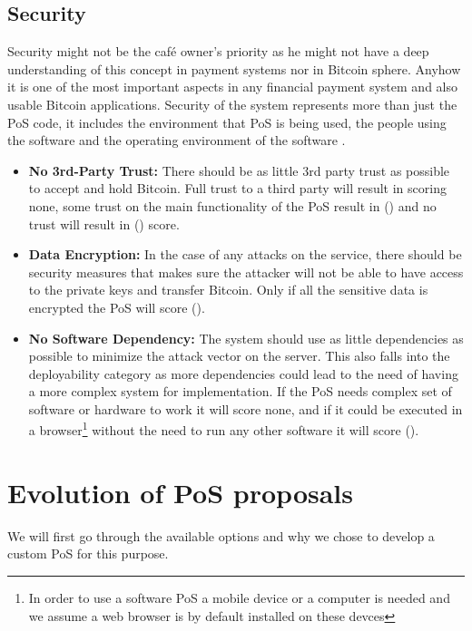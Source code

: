 \subsection{Security} Security might not be the caf\'{e} owner's priority as he might not have a deep understanding of this concept in payment systems nor in Bitcoin sphere. Anyhow it is one of the most important aspects in any financial payment system and also usable Bitcoin applications. Security of the system represents more than just the PoS code, it includes the environment that PoS is being used, the people using the software and the operating environment of the software \cite{securityreq}.
\begin{itemize}

\item \textbf{No 3rd-Party Trust: }There should be as little 3rd party trust as possible to accept and hold Bitcoin. Full trust to a third party will result in scoring none, some trust on the main functionality of the PoS result in (\prt) and no trust will result in (\full)  score.

\item \textbf{Data Encryption: }In the case of any attacks on the service, there should be security measures that makes sure the attacker will not be able to have access to the private keys and transfer Bitcoin. Only if all the sensitive data is encrypted the PoS will score (\full).

\item \textbf{No Software Dependency: }The system should use as little dependencies as possible to minimize the attack vector on the server. This also falls into the deployability category as more dependencies could lead to the need of having a more complex system for implementation. If the PoS needs complex set of software or hardware to work it will score none, and if it could be executed in a browser\footnote{In order to use a software PoS a mobile device or a computer is needed and we assume a web browser is by default installed on these devces} without the need to run any other software it will score (\full).

\end{itemize}

\section{Evolution of PoS proposals}
We will first go through the available options and why we chose to develop a custom PoS for this purpose.

